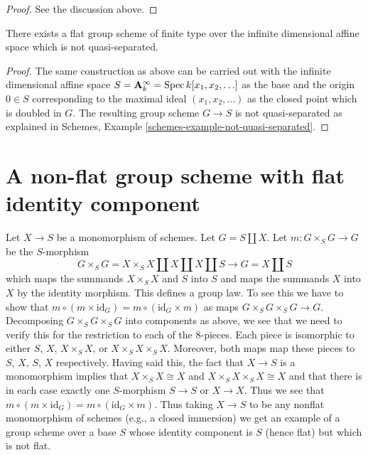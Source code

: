 \begin{proof}
See the discussion above.
\end{proof}

\begin{lemma}
\label{lemma-non-quasi-separated-group-scheme}
There exists a flat group scheme of finite type over the infinite
dimensional affine space which is not quasi-separated.
\end{lemma}

\begin{proof}
The same construction as above can be carried out with the infinite dimensional
affine space $S = \mathbf{A}^\infty_k = \mathop{\mathrm{Spec}} k[x_1, x_2, \ldots]$ as the base
and the origin $0 \in S$ corresponding to the maximal ideal
$(x_1, x_2, \ldots)$ as the closed point which is doubled in $G$.
The resulting group scheme $G \rightarrow S$ is 
not quasi-separated as explained in
Schemes, Example \ref{schemes-example-not-quasi-separated}. 
\end{proof}



\section{A non-flat group scheme with flat identity component}
\label{section-non-flat-group-scheme}

\noindent
Let $X \to S$ be a monomorphism of schemes. Let $G = S \amalg X$.
Let $m : G \times_S G \to G$ be the $S$-morphism
$$
G \times_S G = X \times_S X \amalg X \amalg X \amalg S
\longrightarrow G = X \amalg S
$$
which maps the summands $X \times_S X$ and $S$ into $S$ and
maps the summands $X$ into $X$ by the identity morphism.
This defines a group law. To see this we have to show that
$m \circ (m \times \text{id}_G) = m \circ (\text{id}_G \times m)$
as maps $G \times_S G \times_S G \to G$. Decomposing
$G \times_S G \times_S G$ into components as above, we see that
we need to verify this for the restriction to each of the $8$-pieces.
Each piece is isomorphic to either $S$, $X$, $X \times_S X$, or
$X \times_S X \times_S X$. Moreover, both maps map these pieces
to $S$, $X$, $S$, $X$ respectively. Having said this, the fact that
$X \to S$ is a monomorphism implies that $X \times_S X \cong X$
and $X \times_S X \times_S X \cong X$ and that there is in each case
exactly one $S$-morphism $S \to S$ or $X \to X$. Thus we see
that $m \circ (m \times \text{id}_G) = m \circ (\text{id}_G \times m)$.
Thus taking $X \to S$ to be any
nonflat monomorphism of schemes (e.g., a closed immersion)
we get an example of a group scheme
over a base $S$ whose identity component is $S$ (hence flat)
but which is not flat.

